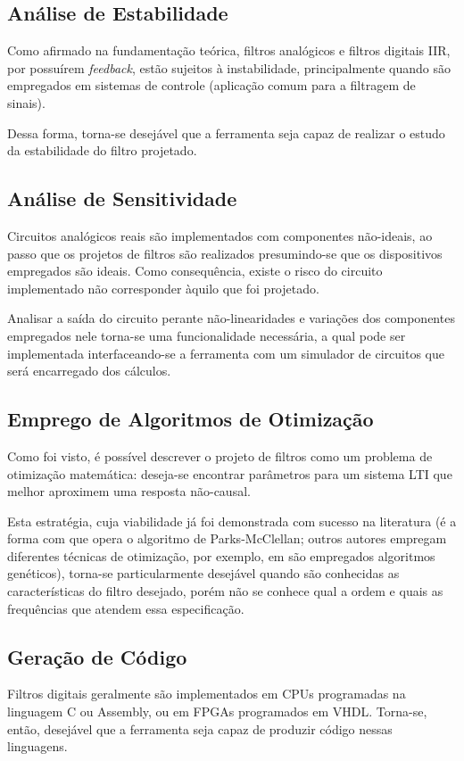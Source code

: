 \subsection{Análise de Estabilidade}
Como afirmado na fundamentação teórica, filtros analógicos e filtros digitais IIR, por possuírem \textit{feedback}, estão sujeitos à instabilidade, principalmente quando são empregados em sistemas de controle (aplicação comum para a filtragem de sinais).

Dessa forma, torna-se desejável que a ferramenta seja capaz de realizar o estudo da estabilidade do filtro projetado. 

\subsection{Análise de Sensitividade}
Circuitos analógicos reais são implementados com componentes não-ideais, ao passo que os projetos de filtros são realizados presumindo-se que os dispositivos empregados são ideais. Como consequência, existe o risco do circuito implementado não corresponder àquilo que foi projetado. 

Analisar a saída do circuito perante não-linearidades e variações dos componentes empregados nele torna-se uma funcionalidade necessária, a qual pode ser implementada interfaceando-se a ferramenta com um simulador de circuitos que será encarregado dos cálculos. 

\subsection{Emprego de Algoritmos de Otimização}
Como foi visto, é possível descrever o projeto de filtros como um problema de otimização matemática: deseja-se encontrar parâmetros para um sistema LTI que melhor aproximem uma resposta não-causal. 

Esta estratégia, cuja viabilidade já foi demonstrada com sucesso na literatura (é a forma com que opera o algoritmo de Parks-McClellan; outros autores empregam diferentes técnicas de otimização, por exemplo, em \cite{barros} são empregados algoritmos genéticos), torna-se particularmente desejável quando são conhecidas as características do filtro desejado, porém não se conhece qual a ordem e quais as frequências que atendem essa especificação.

\subsection{Geração de Código}
Filtros digitais geralmente são implementados em CPUs programadas na linguagem C ou Assembly, ou em FPGAs programados em VHDL. Torna-se, então, desejável que a ferramenta seja capaz de produzir código nessas linguagens.

